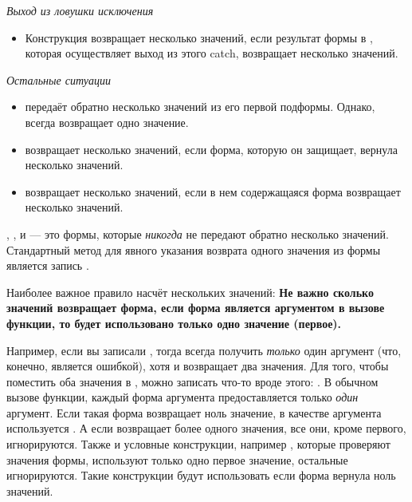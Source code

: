 \begin{flushdesc}
\item[\emph{Выход из ловушки исключения}]\leavevmode
\begin{itemize}

\item
Конструкция  возвращает несколько значений, если результат формы в
, которая осуществляет выход из этого catch, возвращает несколько
значений.
\end{itemize}

\item[\emph{Остальные ситуации}]\leavevmode
\begin{itemize}

\item
{} передаёт обратно несколько значений из его первой
подформы. Однако,  всегда возвращает одно значение.

\item
{} возвращает несколько значений, если форма, которую он
защищает, вернула несколько значений.

\item
{} возвращает несколько значений, если в нем содержащаяся форма
возвращает несколько значений.
\end{itemize}
\end{flushdesc}

,
,  и  --- это формы, которые
\emph{никогда} не передают обратно несколько значений.
Стандартный метод для явного указания возврата одного значения из формы  
является запись .

Наиболее важное правило насчёт нескольких значений:
\textbf{Не важно сколько значений возвращает форма, если форма является
  аргументом в вызове функции, то будет использовано только одно значение
  (первое).} 

Например, если вы записали , тогда  всегда
получить \emph{только} один аргумент (что, конечно, является ошибкой), хотя и
 возвращает два значения. Для того, чтобы поместить оба значения
 в , можно записать что-то вроде этого:
.
В обычном вызове функции, каждый форма аргумента предоставляется только
\emph{один} аргумент. Если такая форма возвращает ноль значение, в качестве
аргумента используется {\false}. А если возвращает более одного значения, все
они, кроме первого, игнорируются.
Также и условные конструкции, например , которые проверяют значения
формы, используют только одно первое значение, остальные игнорируются.
Такие конструкции будут использовать {\false} если форма вернула ноль значений.

